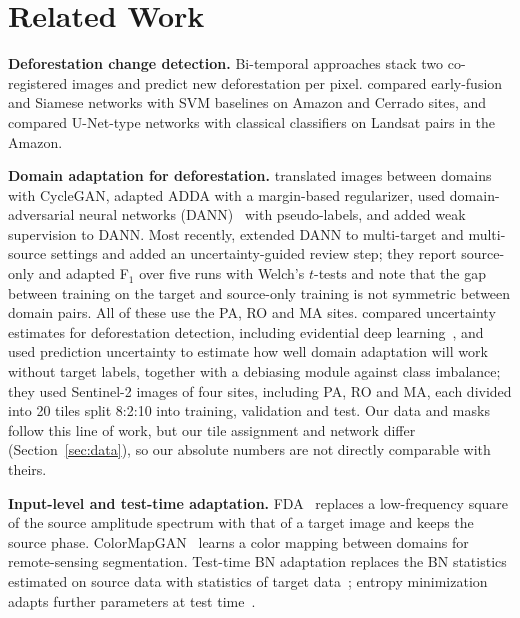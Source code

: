 \documentclass[pdflatex,sn-basic]{sn-jnl}
\newcommand{\Fone}{F$_1$}
\begin{document}
\section{Related Work}\label{sec:related}

\textbf{Deforestation change detection.}
Bi-temporal approaches stack two co-registered images and predict new deforestation per pixel.
\citet{ortegaadarme2020evaluation} compared early-fusion and Siamese networks with SVM baselines on Amazon and Cerrado sites, and \citet{debem2020change} compared U-Net-type networks with classical classifiers on Landsat pairs in the Amazon.

\textbf{Domain adaptation for deforestation.}
\citet{sotovega2021unsupervised} translated images between domains with CycleGAN, \citet{noa2021adversarial} adapted ADDA with a margin-based regularizer, \citet{soto2022domain} used domain-adversarial neural networks (DANN)~\citep{ganin2016domain} with pseudo-labels, and \citet{sotovega2023weakly} added weak supervision to DANN.
Most recently, \citet{demoura2025enhancing} extended DANN to multi-target and multi-source settings and added an uncertainty-guided review step; they report source-only and adapted \Fone{} over five runs with Welch's $t$-tests and note that the gap between training on the target and source-only training is not symmetric between domain pairs.
All of these use the PA, RO and MA sites.
\citet{martinez2024enhancing} compared uncertainty estimates for deforestation detection, including evidential deep learning~\citep{sensoy2018evidential}, and \citet{ortega2026domain} used prediction uncertainty to estimate how well domain adaptation will work without target labels, together with a debiasing module against class imbalance; they used Sentinel-2 images of four sites, including PA, RO and MA, each divided into 20 tiles split 8:2:10 into training, validation and test.
Our data and masks follow this line of work, but our tile assignment and network differ (Section~\ref{sec:data}), so our absolute numbers are not directly comparable with theirs.

\textbf{Input-level and test-time adaptation.}
FDA~\citep{yang2020fda} replaces a low-frequency square of the source amplitude spectrum with that of a target image and keeps the source phase.
ColorMapGAN~\citep{tasar2020colormapgan} learns a color mapping between domains for remote-sensing segmentation.
Test-time BN adaptation replaces the BN statistics estimated on source data with statistics of target data~\citep{schneider2020improving,nado2020evaluating}; entropy minimization adapts further parameters at test time~\citep{wang2021tent}.
\end{document}
